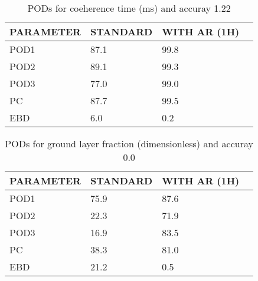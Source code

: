 \documentclass[11pt,english]{article}
\begin{document}
\begin{table}[]
\begin{center}
\begin{tabular}{|l|l|l|l|}
\hline
\multicolumn{1}{|c|}{\cellcolor[HTML]{C0C0C0}\textbf{PARAMETER}} & \multicolumn{1}{c|}{\cellcolor[HTML]{C0C0C0}\textbf{STANDARD}} & \multicolumn{1}{c|}{\cellcolor[HTML]{C0C0C0}\textbf{WITH AR (1H)}} \\
\hline
\cellcolor[HTML]{C0C0C0}POD1  & 87.1                                & 99.8         \\
\cellcolor[HTML]{C0C0C0}POD2  & 89.1                                & 99.3         \\
\cellcolor[HTML]{C0C0C0}POD3  & 77.0                                & 99.0         \\
\cellcolor[HTML]{C0C0C0}PC    & 87.7                                  & 99.5           \\
\cellcolor[HTML]{C0C0C0}EBD   & 6.0                                 & 0.2          \\
\hline
\end{tabular}
\caption{PODs for coeherence time (ms) and accuray 1.22}
\end{center}
\end{table}
\begin{table}[]
\begin{center}
\begin{tabular}{|l|l|l|l|}
\hline
\multicolumn{1}{|c|}{\cellcolor[HTML]{C0C0C0}\textbf{PARAMETER}} & \multicolumn{1}{c|}{\cellcolor[HTML]{C0C0C0}\textbf{STANDARD}} & \multicolumn{1}{c|}{\cellcolor[HTML]{C0C0C0}\textbf{WITH AR (1H)}} \\
\hline
\cellcolor[HTML]{C0C0C0}POD1  & 75.9                                & 87.6         \\
\cellcolor[HTML]{C0C0C0}POD2  & 22.3                                & 71.9         \\
\cellcolor[HTML]{C0C0C0}POD3  & 16.9                                & 83.5         \\
\cellcolor[HTML]{C0C0C0}PC    & 38.3                                  & 81.0           \\
\cellcolor[HTML]{C0C0C0}EBD   & 21.2                                 & 0.5          \\
\hline
\end{tabular}
\caption{PODs for ground layer fraction (dimensionless) and accuray 0.0}
\end{center}
\end{table}
\end{document}
